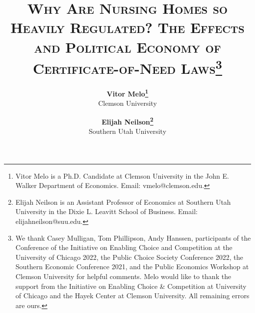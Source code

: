 \documentclass[12pt]{article}
\begin{document}

\title{\textsc{Why Are Nursing Homes so Heavily Regulated? The Effects and Political Economy of Certificate-of-Need Laws}\thanks{We thank Casey Mulligan, Tom Phillipson, Andy Hanssen, participants of the Conference of the Initiative on Enabling Choice and Competition at the University of Chicago 2022, the Public Choice Society Conference 2022, the Southern Economic Conference 2021, and the Public Economics Workshop at Clemson University for helpful comments. Melo would like to thank the support from the Initiative on Enabling Choice & Competition at University of Chicago and the Hayek Center at Clemson University. All remaining errors are ours.}\\
	$~$\\}

\medskip

\author{\textbf{Vitor Melo\protect\thanks{Vitor Melo is a Ph.D. Candidate at Clemson University in the John E. Walker Department of Economics. Email: vmelo@clemson.edu.}} \\ Clemson University
\and
\textbf{Elijah Neilson\protect\thanks{Elijah Neilson is an Assistant Professor of Economics at Southern Utah University in the Dixie L. Leavitt School of Business. Email: elijahneilson@suu.edu.}} \\ Southern Utah University
  	}		

\date{}              %





\renewcommand{\thefootnote}{\fnsymbol{footnote}}

\singlespacing

\maketitle
\end{document}
